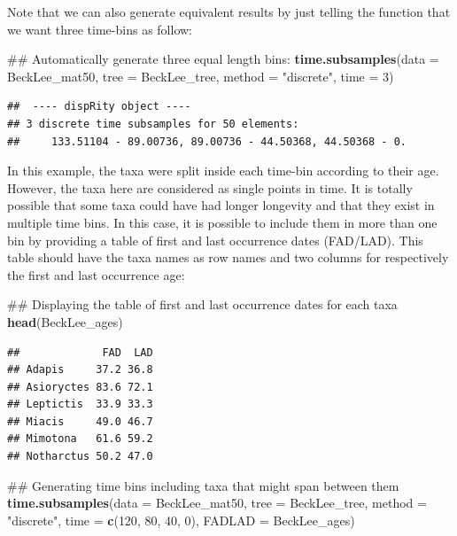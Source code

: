 \documentclass[]{book}
\newenvironment{Shaded}{\begin{snugshade}}{\end{snugshade}}
\newcommand{\KeywordTok}[1]{\textcolor[rgb]{0.13,0.29,0.53}{\textbf{#1}}}
\newcommand{\DataTypeTok}[1]{\textcolor[rgb]{0.13,0.29,0.53}{#1}}
\newcommand{\DecValTok}[1]{\textcolor[rgb]{0.00,0.00,0.81}{#1}}
\newcommand{\StringTok}[1]{\textcolor[rgb]{0.31,0.60,0.02}{#1}}
\newcommand{\NormalTok}[1]{#1}
\theoremstyle{definition}
\theoremstyle{definition}
\theoremstyle{remark}
\begin{document}
Note that we can also generate equivalent results by just telling the
function that we want three time-bins as follow:

\begin{Shaded}
\begin{Highlighting}[]
\NormalTok{## Automatically generate three equal length bins:}
\KeywordTok{time.subsamples}\NormalTok{(}\DataTypeTok{data =}\NormalTok{ BeckLee_mat50, }\DataTypeTok{tree =}\NormalTok{ BeckLee_tree, }\DataTypeTok{method =} \StringTok{"discrete"}\NormalTok{,}
                \DataTypeTok{time =} \DecValTok{3}\NormalTok{)}
\end{Highlighting}
\end{Shaded}

\begin{verbatim}
##  ---- dispRity object ---- 
## 3 discrete time subsamples for 50 elements:
##     133.51104 - 89.00736, 89.00736 - 44.50368, 44.50368 - 0.
\end{verbatim}

In this example, the taxa were split inside each time-bin according to
their age. However, the taxa here are considered as single points in
time. It is totally possible that some taxa could have had longer
longevity and that they exist in multiple time bins. In this case, it is
possible to include them in more than one bin by providing a table of
first and last occurrence dates (FAD/LAD). This table should have the
taxa names as row names and two columns for respectively the first and
last occurrence age:

\begin{Shaded}
\begin{Highlighting}[]
\NormalTok{## Displaying the table of first and last occurrence dates for each taxa}
\KeywordTok{head}\NormalTok{(BeckLee_ages)}
\end{Highlighting}
\end{Shaded}

\begin{verbatim}
##             FAD  LAD
## Adapis     37.2 36.8
## Asioryctes 83.6 72.1
## Leptictis  33.9 33.3
## Miacis     49.0 46.7
## Mimotona   61.6 59.2
## Notharctus 50.2 47.0
\end{verbatim}

\begin{Shaded}
\begin{Highlighting}[]
\NormalTok{## Generating time bins including taxa that might span between them}
\KeywordTok{time.subsamples}\NormalTok{(}\DataTypeTok{data =}\NormalTok{ BeckLee_mat50, }\DataTypeTok{tree =}\NormalTok{ BeckLee_tree, }\DataTypeTok{method =} \StringTok{"discrete"}\NormalTok{,}
                \DataTypeTok{time =} \KeywordTok{c}\NormalTok{(}\DecValTok{120}\NormalTok{, }\DecValTok{80}\NormalTok{, }\DecValTok{40}\NormalTok{, }\DecValTok{0}\NormalTok{), }\DataTypeTok{FADLAD =}\NormalTok{ BeckLee_ages)}
\end{Highlighting}
\end{Shaded}
\end{document}
